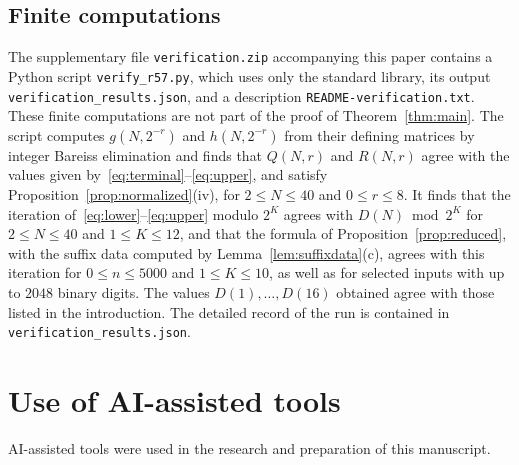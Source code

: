 \documentclass{amsart}
\theoremstyle{definition}
\theoremstyle{remark}
\numberwithin{equation}{section}
\begin{document}
\subsection{Finite computations}
\begin{sloppypar}
The supplementary file \texttt{verification.zip} accompanying this paper contains a Python script \texttt{verify\_r57.py}, which uses only the standard library, its output \texttt{verification\_results.json}, and a description \texttt{README-verification.txt}. These finite computations are not part of the proof of Theorem~\ref{thm:main}. The script computes $g(N,2^{-r})$ and $h(N,2^{-r})$ from their defining matrices by integer Bareiss elimination and finds that $Q(N,r)$ and $R(N,r)$ agree with the values given by~\eqref{eq:terminal}--\eqref{eq:upper}, and satisfy Proposition~\ref{prop:normalized}(iv), for $2\le N\le40$ and $0\le r\le8$. It finds that the iteration of~\eqref{eq:lower}--\eqref{eq:upper} modulo $2^K$ agrees with $D(N)\bmod 2^K$ for $2\le N\le40$ and $1\le K\le12$, and that the formula of Proposition~\ref{prop:reduced}, with the suffix data computed by Lemma~\ref{lem:suffixdata}(c), agrees with this iteration for $0\le n\le5000$ and $1\le K\le10$, as well as for selected inputs with up to $2048$ binary digits. The values $D(1),\dots,D(16)$ obtained agree with those listed in the introduction. The detailed record of the run is contained in \texttt{verification\_results.json}.
\end{sloppypar}

\section*{Use of AI-assisted tools}

AI-assisted tools were used in the research and preparation of this manuscript.
\end{document}
